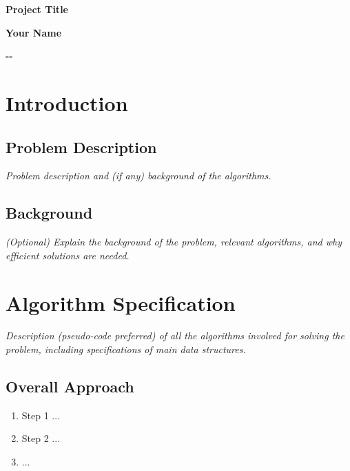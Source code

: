 \documentclass[12pt, a4paper]{report}
\makeatletter
\renewcommand{\today}{\the\year-\two@digits{\month}-\two@digits{\day}}
\makeatother
\begin{document}
\begin{titlepage}
    \centering
    \vspace*{3cm}
    {\huge\bfseries Project Title\par}         %
    \vspace{2cm}
    {\LARGE\bfseries Your Name\par}            %
    \vspace{2cm}
    {\Large\bfseries \today\par}               %
\end{titlepage}
\newpage

\chapter{Introduction}

\section{Problem Description}
\textit{Problem description and (if any) background of the algorithms.}

\section{Background}
\textit{ (Optional) Explain the background of the problem, relevant algorithms, and why efficient solutions are needed.}

\chapter{Algorithm Specification}

\textit{Description (pseudo-code preferred) of all the algorithms involved for solving the problem, including specifications of main data structures.}

\section{Overall Approach}
\begin{enumerate}
    \item Step 1 ...
    \item Step 2 ...
    \item ...
\end{enumerate}
\end{document}
